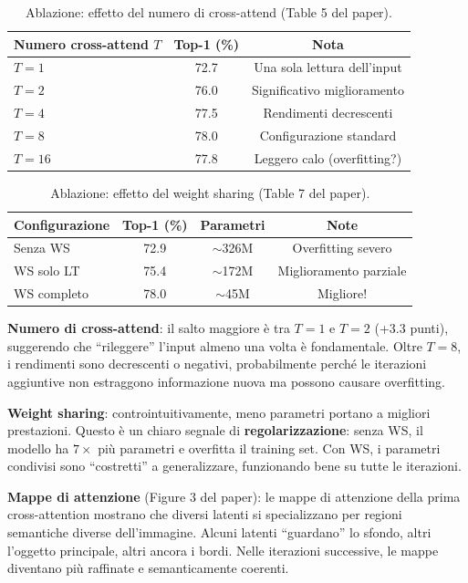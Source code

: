\documentclass[12pt,a4paper]{article}
\begin{document}
\begin{table}[htbp]
\centering
\caption{Ablazione: effetto del numero di cross-attend (Table 5 del paper).}
\begin{tabular}{@{}lcc@{}}
\toprule
\textbf{Numero cross-attend $T$} & \textbf{Top-1 (\%)} & \textbf{Nota} \\
\midrule
$T = 1$ & 72.7 & Una sola lettura dell'input \\
$T = 2$ & 76.0 & Significativo miglioramento \\
$T = 4$ & 77.5 & Rendimenti decrescenti \\
$T = 8$ & 78.0 & Configurazione standard \\
$T = 16$ & 77.8 & Leggero calo (overfitting?) \\
\bottomrule
\end{tabular}
\end{table}

\begin{table}[htbp]
\centering
\caption{Ablazione: effetto del weight sharing (Table 7 del paper).}
\begin{tabular}{@{}lccc@{}}
\toprule
\textbf{Configurazione} & \textbf{Top-1 (\%)} & \textbf{Parametri} & \textbf{Note} \\
\midrule
Senza WS & 72.9 & $\sim$326M & Overfitting severo \\
WS solo LT & 75.4 & $\sim$172M & Miglioramento parziale \\
WS completo & 78.0 & $\sim$45M & Migliore! \\
\bottomrule
\end{tabular}
\end{table}

\begin{notabox}
\textbf{Numero di cross-attend}: il salto maggiore \`e tra $T=1$ e $T=2$ (+3.3 punti), suggerendo che ``rileggere'' l'input almeno una volta \`e fondamentale. Oltre $T=8$, i rendimenti sono decrescenti o negativi, probabilmente perch\'e le iterazioni aggiuntive non estraggono informazione nuova ma possono causare overfitting.

\textbf{Weight sharing}: controintuitivamente, meno parametri portano a migliori prestazioni. Questo \`e un chiaro segnale di \textbf{regolarizzazione}: senza WS, il modello ha $7\times$ pi\`u parametri e overfitta il training set. Con WS, i parametri condivisi sono ``costretti'' a generalizzare, funzionando bene su tutte le iterazioni.

\textbf{Mappe di attenzione} (Figure 3 del paper): le mappe di attenzione della prima cross-attention mostrano che diversi latenti si specializzano per regioni semantiche diverse dell'immagine. Alcuni latenti ``guardano'' lo sfondo, altri l'oggetto principale, altri ancora i bordi. Nelle iterazioni successive, le mappe diventano pi\`u raffinate e semanticamente coerenti.
\end{notabox}
\end{document}
